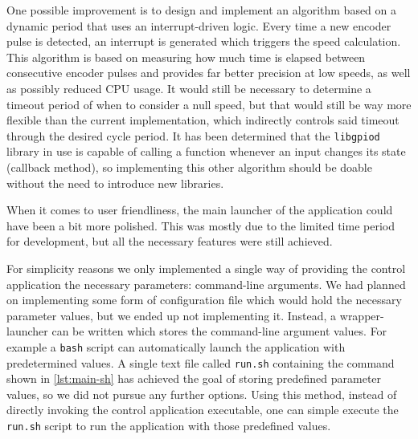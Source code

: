 One possible improvement is to design and implement an algorithm based on a dynamic period that uses an interrupt-driven logic.
Every time a new encoder pulse is detected, an interrupt is generated which triggers the speed calculation.
This algorithm is based on measuring how much time is elapsed between consecutive encoder pulses and provides far better precision at low speeds, as well as possibly reduced CPU usage.
It would still be necessary to determine a timeout period of when to consider a null speed, but that would still be way more flexible than the current implementation, which indirectly controls said timeout through the desired cycle period.
It has been determined that the \verb|libgpiod| library in use is capable of calling a function whenever an input changes its state (callback method), so implementing this other algorithm should be doable without the need to introduce new libraries.

When it comes to user friendliness, the main launcher of the application could have been a bit more polished.
This was mostly due to the limited time period for development, but all the necessary features were still achieved.

For simplicity reasons we only implemented a single way of providing the control application the necessary parameters: command-line arguments.
We had planned on implementing some form of configuration file which would hold the necessary parameter values, but we ended up not implementing it.
Instead, a wrapper-launcher can be written which stores the command-line argument values. For example a \verb|bash| script can automatically launch the application with predetermined values.
A single text file called \verb|run.sh| containing the command shown in \autoref{lst:main-sh} has achieved the goal of storing predefined parameter values, so we did not pursue any further options.
Using this method, instead of directly invoking the control application executable, one can simple execute the \verb|run.sh| script to run the application with those predefined values.


